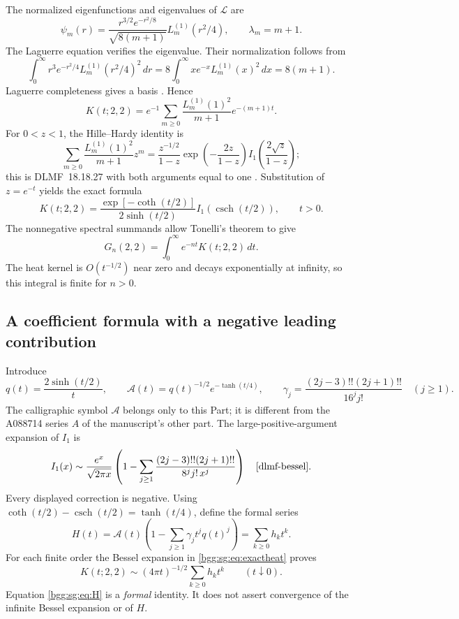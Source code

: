 \documentclass[11pt,a4paper]{article}
\numberwithin{equation}{section}
\theoremstyle{definition}
\theoremstyle{remark}
\theoremstyle{definition}
\begin{document}
The normalized eigenfunctions and eigenvalues of \(\mathscr L\) are
\[
 \psi_m(r)=\frac{r^{3/2}e^{-r^2/8}}{\sqrt{8(m+1)}}
                     L_m^{(1)}(r^2/4),\qquad \lambda_m=m+1.
\]
The Laguerre equation verifies the eigenvalue.  Their normalization
follows from
\[
 \int_0^\infty r^3e^{-r^2/4}L_m^{(1)}(r^2/4)^2\,dr
 =8\int_0^\infty xe^{-x}L_m^{(1)}(x)^2\,dx=8(m+1).
\]
Laguerre completeness gives a basis \cite{dlmf-laguerre}.  Hence
\[
 K(t;2,2)
 =e^{-1}\sum_{m\ge0}\frac{L_m^{(1)}(1)^2}{m+1}e^{-(m+1)t}.
\]
For \(0<z<1\), the Hille--Hardy identity is
\[
 \sum_{m\ge0}\frac{L_m^{(1)}(1)^2}{m+1}z^m
 =\frac{z^{-1/2}}{1-z}\exp\!\left(-\frac{2z}{1-z}\right)
        I_1\!\left(\frac{2\sqrt z}{1-z}\right);
\]
this is DLMF~18.18.27 with both arguments equal to one
\cite{dlmf-laguerre}.  Substitution of \(z=e^{-t}\) yields the exact
formula
\begin{equation}\label{bgg:sg:eq:exactheat}
 \boxed{
 K(t;2,2)=
 \frac{\exp[-\coth(t/2)]}{2\sinh(t/2)}
            I_1(\operatorname{csch}(t/2)),\qquad t>0.}
\end{equation}
The nonnegative spectral summands allow Tonelli's theorem to give
\begin{equation}\label{bgg:sg:eq:laplace}
 G_n(2,2)=\int_0^\infty e^{-nt}K(t;2,2)\,dt.
\end{equation}
The heat kernel is \(O(t^{-1/2})\) near zero and decays exponentially
at infinity, so this integral is finite for \(n>0\).

\subsection{A coefficient formula with a negative leading contribution}

Introduce
\begin{equation}\label{bgg:sg:eq:qAbeta}
 q(t)=\frac{2\sinh(t/2)}t,\qquad
 \mathcal A(t)=q(t)^{-1/2}e^{-\tanh(t/4)},\qquad
 \gamma_j=\frac{(2j-3)!!(2j+1)!!}{16^j j!}\quad(j\ge1).
\end{equation}
The calligraphic symbol \(\mathcal A\) belongs only to this Part; it is
different from the A088714 series \(A\) of the manuscript's other part.
The large-positive-argument expansion of \(I_1\) is
\[
 I_1(x)\sim\frac{e^x}{\sqrt{2\pi x}}
 \left(1-\sum_{j\ge1}
       \frac{(2j-3)!!(2j+1)!!}{8^jj!\,x^j}\right)
 \quad\cite{dlmf-bessel}.
\]
Every displayed correction is negative.
Using
\(\coth(t/2)-\operatorname{csch}(t/2)=\tanh(t/4)\),
define the formal series
\begin{equation}\label{bgg:sg:eq:H}
 H(t)=\mathcal A(t)
       \left(1-\sum_{j\ge1}\gamma_jt^jq(t)^j\right)
      =\sum_{k\ge0}h_kt^k.
\end{equation}
For each finite order the Bessel expansion in \eqref{bgg:sg:eq:exactheat}
proves
\[
 K(t;2,2)\sim(4\pi t)^{-1/2}\sum_{k\ge0}h_kt^k
 \qquad(t\downarrow0).
\]
Equation \eqref{bgg:sg:eq:H} is a \emph{formal} identity.  It does not assert
convergence of the infinite Bessel expansion or of \(H\).
\end{document}
